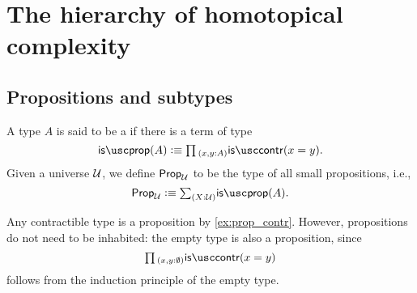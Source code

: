 
\section{The hierarchy of homotopical complexity}
\label{chap:hierarchy}



\subsection{Propositions and subtypes}

\begin{defn}
A type $A$ is said to be a  if there is a term of type
\begin{equation*}
\isprop(A)\defeq\prd{x,y:A}\iscontr(x=y).
\end{equation*}
Given a universe $\mathcal{U}$, we define $\mathsf{Prop}_{\mathcal{U}}$ to be the type of all small propositions, i.e.,
\begin{equation*}
  \prop_\UU\defeq\sm{X:\UU}\isprop(A).
\end{equation*}
\end{defn}

\begin{eg}\label{eg:prop_contr}
Any contractible type is a proposition by \cref{ex:prop_contr}. However, propositions do not need to be inhabited: the empty type is also a proposition, since
\begin{equation*}
\prd{x,y:\emptyt}\iscontr(x=y)
\end{equation*}
follows from the induction principle of the empty type.
\end{eg}

